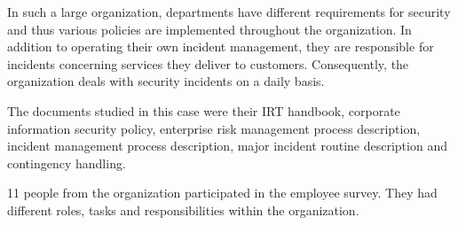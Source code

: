 In such a large organization, departments have different requirements for security and thus various policies are implemented throughout the organization. In addition to operating their own incident management, they are responsible for incidents concerning services they deliver to customers. Consequently, the organization deals with security incidents on a daily basis. 

The documents studied in this case were their \ac{IRT} handbook, corporate information security policy, enterprise risk management process description, incident management process description, major incident routine description and contingency handling.

11 people from the organization participated in the employee survey. They had different roles, tasks and responsibilities within the organization.